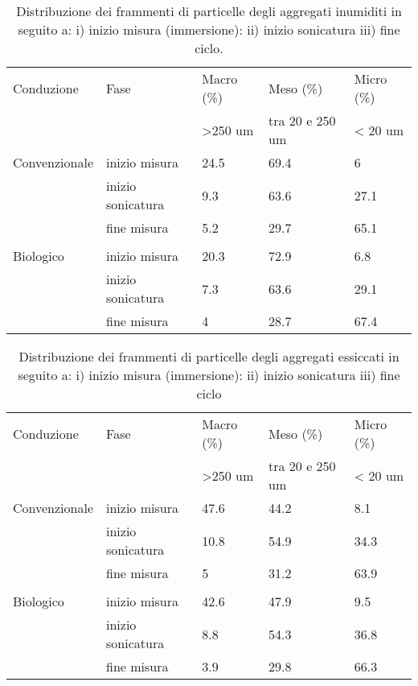 \documentclass[a4paper]{article}
\begin{document}
\begin{table}[ht]
\centering
\caption{Distribuzione dei frammenti di particelle degli aggregati
  inumiditi in seguito a: i) inizio misura (immersione): ii) inizio
  sonicatura iii) fine ciclo.}
\label{tab:iufw}
\begin{tabular}{lllll}
  \hline
  Conduzione & Fase & Macro (\%) & Meso (\%) & Micro (\%) \\
             &      & >250 um   & tra 20 e 250 um & < 20 um\\
  \hline
Convenzionale & inizio misura & 24.5 & 69.4 & 6 \\ 
    & inizio sonicatura & 9.3 & 63.6 & 27.1 \\ 
    & fine misura & 5.2 & 29.7 & 65.1 \\ 
\\ 
  Biologico  & inizio misura & 20.3 & 72.9 & 6.8 \\ 
    & inizio sonicatura & 7.3 & 63.6 & 29.1 \\ 
    & fine misura & 4 & 28.7 & 67.4 \\ 
   \hline
\end{tabular}
\end{table}

\begin{table}[ht]
\centering
\caption{Distribuzione dei frammenti di particelle degli aggregati
  essiccati in seguito a: i) inizio misura (immersione): ii) inizio
  sonicatura iii) fine ciclo }
\label{tab:iufd}
\begin{tabular}{lllll}
  \hline
  Conduzione & Fase & Macro (\%) & Meso (\%) & Micro (\%) \\
             &      & >250 um   & tra 20 e 250 um & < 20 um\\
  \hline
Convenzionale & inizio  misura & 47.6 & 44.2 & 8.1 \\ 
    & inizio sonicatura & 10.8 & 54.9 & 34.3 \\ 
    & fine misura & 5 & 31.2 & 63.9 \\ 
 \\ 
  Biologico  & inizio misura & 42.6 & 47.9 & 9.5 \\ 
    & inizio sonicatura & 8.8 & 54.3 & 36.8 \\ 
    & fine misura & 3.9 & 29.8 & 66.3 \\ 
   \hline
\end{tabular}
\end{table}
\end{document}
